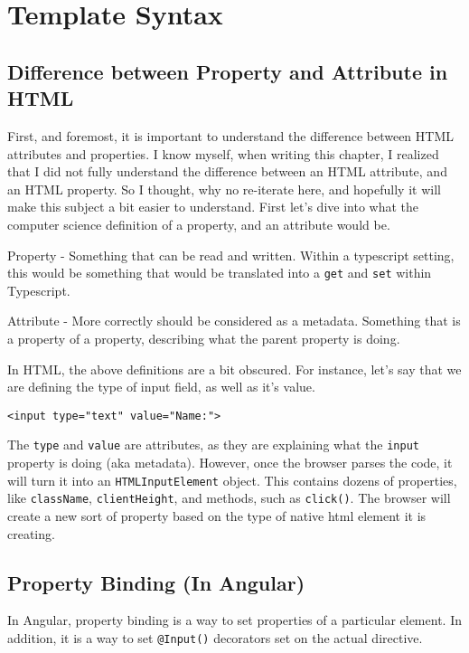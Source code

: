 
\section{ Template Syntax }

\subsection{ Difference between Property and Attribute in HTML }

First, and foremost, it is important to understand the difference between HTML 
attributes and properties. I know myself, when writing this chapter, I realized
that I did not fully understand the difference between an HTML attribute, and
an HTML property. So I thought, why no re-iterate here, and hopefully it will
make this subject a bit easier to understand. First let's dive into what the 
computer science definition of a property, and an attribute would be. 

Property - Something that can be read and written. Within a typescript setting, 
this would be something that would be translated into a \lstinline{get} and  
\lstinline{set} within Typescript. 

Attribute - More correctly should be considered as a metadata. Something that
is a property of a property, describing what the parent property is doing. 

In HTML, the above definitions are a bit obscured. For instance, let's say
that we are defining the type of input field, as well as it's value. 
\begin{lstlisting}
<input type="text" value="Name:">  
\end{lstlisting}

The \lstinline{type} and \lstinline{value} are attributes, as they are 
explaining what the \lstinline{input} property is doing (aka metadata).
However, once the browser parses the code, it will turn it into an 
\lstinline{HTMLInputElement} object. This contains dozens of properties, like 
\lstinline{className}, \lstinline{clientHeight}, and methods, such as 
\lstinline{click()}. The browser will create a new sort of property based on 
the type of native html element it is creating. 


\subsection{ Property Binding (In Angular) }
In Angular, property binding is a way to set properties of a particular 
element. In addition, it is a way to set \lstinline{@Input()} decorators set 
on the actual directive. 

